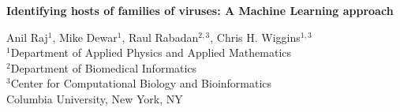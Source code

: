 \documentclass[11pt,amsmath,amssymb,amstex]{article}
\begin{document}
\begin{center}
\pagestyle{empty}
\textbf{Identifying hosts of families of viruses: A Machine Learning approach}

\small{
Anil Raj$^{1}$, Mike Dewar$^{1}$, Raul Rabadan$^{2,3}$, Chris H. Wiggins$^{1,3}$\\
$^{1}$Department of Applied Physics and Applied Mathematics\\
$^{2}$Department of Biomedical Informatics\\
$^{3}$Center for Computational Biology and Bioinformatics\\
Columbia University, New York, NY\\
}
\end{center}



%
%
\end{document}
